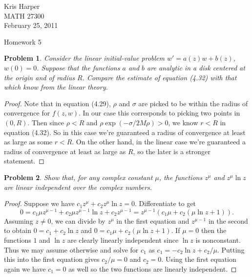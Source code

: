 \documentclass{article}
\newtheorem{problem}{Problem}
\begin{document}
\begin{flushright}
Kris Harper\\

MATH 27300\\

February 25, 2011
\end{flushright}

\begin{center}
Homework 5
\end{center}

\begin{problem}
Consider the linear initial-value problem $w' = a(z)w + b(z)$, $w(0) = 0$. Suppose that the functions $a$ and $b$ are analytic in a disk centered at the origin and of radius $R$. Compare the estimate of equation (4.32) with that which know from the linear theory.
\end{problem}
\begin{proof}
Note that in equation (4.29), $\rho$ and $\sigma$ are picked to be within the radius of convergence for $f(z,w)$. In our case this corresponds to picking two points in $(0,R)$. Then since $\rho < R$ and $\rho \exp(-\sigma/2M\rho) > 0$, we know $r < R$ in equation (4.32). So in this case we're guaranteed a radius of convergence at least as large as some $r < R$. On the other hand, in the linear case we're guaranteed a radius of convergence at least as large as $R$, so the later is a stronger statement.
\end{proof}

\begin{problem}
Show that, for any complex constant $\mu$, the functions $z^{\mu}$ and $z^{\mu} \ln z$ are linear independent over the complex numbers.
\end{problem}
\begin{proof}
Suppose we have $c_1z^{\mu} + c_2z^{\mu} \ln z = 0$. Differentiate to get
\[
0 = c_1 \mu z^{\mu - 1} + c_2 \mu z^{\mu - 1} \ln z + c_2 z^{\mu - 1} = z^{\mu - 1}(c_1 \mu + c_2(\mu \ln z + 1)).
\]
Assuming $z \neq 0$, we can divide by $z^{\mu}$ in the first equation and $z^{\mu - 1}$ in the second to obtain $0 = c_1 + c_2 \ln z$ and $0 = c_1 \mu + c_2(\mu \ln z + 1)$. If $\mu = 0$ then the functions $1$ and $\ln z$ are clearly linearly independent since $\ln z$ is nonconstant. Thus we may assume otherwise and solve for $c_1$ as $c_1 = -c_2 \ln z + c_2/\mu$. Putting this into the first equation gives $c_2/\mu = 0$ and $c_2 = 0$. Using the first equation again we have $c_1 = 0$ as well so the two functions are linearly independent.
\end{proof}
\end{document}
